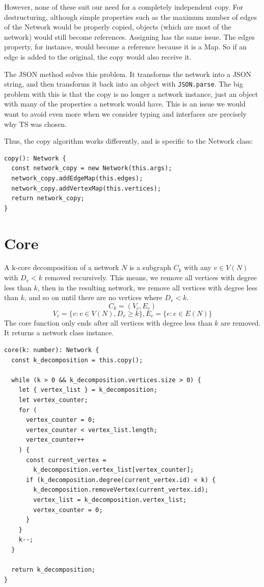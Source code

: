 However, none of these suit our need for a completely independent copy.
For destructuring, although simple properties such as the maximum number of edges of the Network would be properly copied,
objects (which are most of the network) would still become references.
Assigning has the same issue.
The edges property, for instance, would become a reference because it is a Map.
So if an edge is added to the original, the copy would also receive it.

The JSON method solves this problem.
It transforms the network into a JSON string, and then transforms it back into an object with \texttt{JSON.parse}.
The big problem with this is that the copy is no longer a network instance, just an object with many of the properties a network would have.
This is an issue we would want to avoid even more when we consider typing and interfaces are precisely why TS was chosen.

Thus, the copy algorithm works differently, and is specific to the Network class:

\begin{verbatim}
copy(): Network {
  const network_copy = new Network(this.args);
  network_copy.addEdgeMap(this.edges);
  network_copy.addVertexMap(this.vertices);
  return network_copy;
}
\end{verbatim}

\section{Core}

A k-core decomposition of a network $N$ is a subgraph $C_k$ with any
$v\in V(N)$ with $D_v<k$ removed recursively.
This means, we remove all vertices with degree less than $k$,
then in the resulting network, we remove all vertices with
degree less than $k$, and so on until there are no vertices
where $D_v<k$.
$$C_k=(V_c,E_c)$$
$$V_c=\{v:v\in V(N),D_v\geq k\}, E_c=\{e:e\in E(N)\}$$
The core function only ends after all vertices with degree less than $k$ are removed.
It returns a network class instance.

\begin{verbatim}
core(k: number): Network {
  const k_decomposition = this.copy();

  while (k > 0 && k_decomposition.vertices.size > 0) {
    let { vertex_list } = k_decomposition;
    let vertex_counter;
    for (
      vertex_counter = 0;
      vertex_counter < vertex_list.length;
      vertex_counter++
    ) {
      const current_vertex =
        k_decomposition.vertex_list[vertex_counter];
      if (k_decomposition.degree(current_vertex.id) < k) {
        k_decomposition.removeVertex(current_vertex.id);
        vertex_list = k_decomposition.vertex_list;
        vertex_counter = 0;
      }
    }
    k--;
  }

  return k_decomposition;
}
\end{verbatim}

